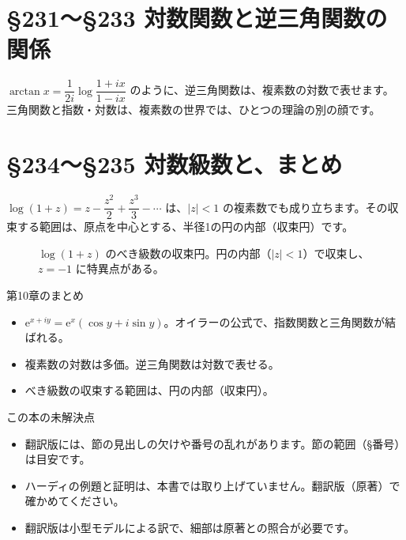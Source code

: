 \documentclass[a4paper,11pt,openany]{ltjsbook}
\newcommand{\ee}{\mathrm{e}}
\begin{document}
\section{§231〜§233 対数関数と逆三角関数の関係}

$\arctan x=\dfrac{1}{2i}\log\dfrac{1+ix}{1-ix}$ のように、逆三角関数は、複素数の対数で表せます。三角関数と指数・対数は、複素数の世界では、ひとつの理論の別の顔です。

\section{§234〜§235 対数級数と、まとめ}

$\log(1+z)=z-\dfrac{z^2}{2}+\dfrac{z^3}{3}-\cdots$ は、$|z|<1$ の複素数でも成り立ちます。その収束する範囲は、原点を中心とする、半径1の円の内部（収束円）です。

\begin{figure}[htbp]
\centering
{}
\caption{$\log(1+z)$ のべき級数の収束円。円の内部（$|z|<1$）で収束し、$z=-1$ に特異点がある。}
\end{figure}

\begin{pointbox}{第10章のまとめ}
\begin{itemize}[leftmargin=1.5em]
\item $\ee^{x+iy}=\ee^x(\cos y+i\sin y)$。オイラーの公式で、指数関数と三角関数が結ばれる。
\item 複素数の対数は多価。逆三角関数は対数で表せる。
\item べき級数の収束する範囲は、円の内部（収束円）。
\end{itemize}
\end{pointbox}

\begin{notebox}{この本の未解決点}
\begin{itemize}[leftmargin=1.5em]
\item 翻訳版には、節の見出しの欠けや番号の乱れがあります。節の範囲（§番号）は目安です。
\item ハーディの例題と証明は、本書では取り上げていません。翻訳版（原著）で確かめてください。
\item 翻訳版は小型モデルによる訳で、細部は原著との照合が必要です。
\end{itemize}
\end{notebox}
\end{document}

